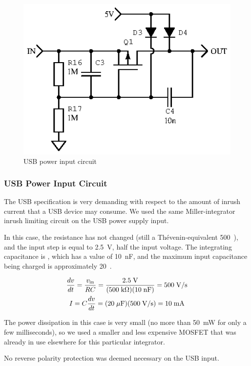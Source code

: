 \begin{figure}[H]
\centering
\includegraphics{too/usbinput}
\caption{USB power input circuit}
\label{fig:usbpower}
\end{figure}

\subsubsection{USB Power Input Circuit}


The USB specification is very demanding with respect to the amount of inrush
current that a USB device may consume. We used the same Miller-integrator
inrush limiting circuit on the USB power supply input.

In this case, the resistance has not changed (still a Th\'evenin-equivalent
500~\kOhm), and the input step is equal to 2.5~V, half the
input voltage. The integrating capacitance is , which has a value of 10~nF,
and the maximum input capacitance being charged is approximately 20~\uF.

\begin{gather*}
    \frac{dv}{dt} = \frac{v_{\mathrm{in}}}{RC} = \frac{2.5\;\mathrm{V}}{(500\;\mathrm{k\Omega})(10\;\mathrm{nF})}
    = 500\;\mathrm{V/s} \\
    I = C \frac{dv}{dt} = (20\;\mathrm{\mu F})(500\;\mathrm{V/s}) = 10\;\mathrm{mA}
\end{gather*}

The power dissipation in this case is very small (no more than 50~mW for
only a few milliseconds), so we used a smaller and less expensive MOSFET that
was already in use elsewhere for this particular integrator.

No reverse polarity protection was deemed necessary on the USB input.

